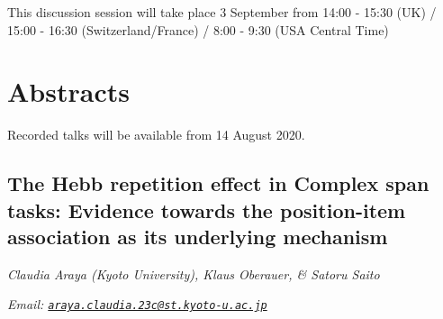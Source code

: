 \documentclass[
  12pt,
]{book}
\begin{document}
This discussion session will take place 3 September from 14:00 - 15:30 (UK) / 15:00 - 16:30 (Switzerland/France) / 8:00 - 9:30 (USA Central Time)

\hypertarget{abstracts-4}{%
\section{Abstracts}\label{abstracts-4}}

Recorded talks will be available from 14 August 2020.

\hypertarget{the-hebb-repetition-effect-in-complex-span-tasks-evidence-towards-the-position-item-association-as-its-underlying-mechanism}{%
\subsection{The Hebb repetition effect in Complex span tasks: Evidence towards the position-item association as its underlying mechanism}\label{the-hebb-repetition-effect-in-complex-span-tasks-evidence-towards-the-position-item-association-as-its-underlying-mechanism}}

\emph{Claudia Araya (Kyoto University), Klaus Oberauer, \& Satoru Saito}

\emph{Email: \href{mailto:araya.claudia.23c@st.kyoto-u.ac.jp}{\nolinkurl{araya.claudia.23c@st.kyoto-u.ac.jp}}}
\end{document}

